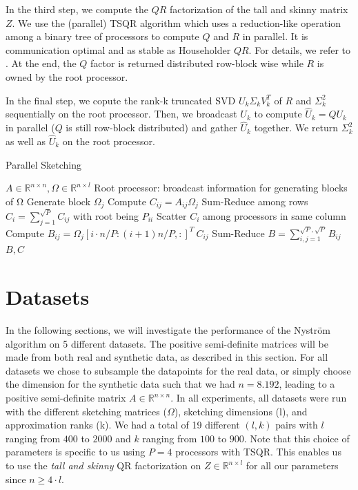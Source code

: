 \documentclass{article}
\theoremstyle{definition}
\begin{document}
In the third step, we compute the $QR$ factorization of the tall and skinny matrix $Z$. We use the (parallel) TSQR algorithm which uses a reduction-like operation among a binary tree of processors to compute $Q$ and $R$ in parallel. It is communication optimal and as stable as Householder $QR$. For details, we refer to \cite{demmel2008}. At the end, the $Q$ factor is returned distributed row-block wise while $R$ is owned by the root processor.

In the final step, we copute the rank-k truncated SVD $U_k \Sigma_k V_k^T$ of $R$ and $\Sigma_k^2$ sequentially on the root processor. Then, we broadcast $U_k$ to compute $\hat{U}_k = Q U_k$ in parallel ($Q$ is still row-block distributed) and gather $\hat{U}_k$ together. We return $\Sigma_k^2$ as well as $\hat{U}_k$ on the root processor.

\begin{algorithm}[t]
    \caption{Parallel Sketching} \label{algo:sketching}
    \begin{algorithmic}[1]
        \Require $A \in \mathbb{R}^{n \times n}, \Omega \in \mathbb{R}^{n \times l}$
        \State Root processor: broadcast information for generating blocks of Ω
            \State Generate block $\Omega_j$
            \State Compute $C_{ij} = A_{ij} \Omega_j$
            \State Sum-Reduce among rows $C_i = \sum_{j = 1}^{\sqrt{P}} C_{ij}$ with root being $P_{ii}$
            \State Scatter $C_i$ among processors in same column
            \State Compute $B_{ij} = \Omega_j[i \cdot n/P : (i+1) n/P, :]^T \ C_{ij}$
        \EndFor
        \State Sum-Reduce $B = \sum_{i,j = 1}^{\sqrt{P}, \sqrt{P}} B_{ij}$
        \Ensure $B, C$
    \end{algorithmic}
\end{algorithm}

\section{Datasets}\label{sec:datasets}

In the following sections, we will investigate the performance of the Nyström algorithm on 5 different datasets. The positive semi-definite matrices will be made from both real and synthetic data, as described in this section. For all datasets we chose to subsample the datapoints for the real data, or simply choose the dimension for the synthetic data such that we had $n=8.192$, leading to a positive semi-definite matrix $A\in\mathbb{R}^{n\times n}$. In all experiments, all datasets were run with the different sketching matrices ($\Omega$), sketching dimensions (l), and approximation ranks (k). We had a total of 19 different $(l,k)$ pairs with $l$ ranging from $400$ to $2000$ and $k$ ranging from $100$ to $900$. Note that this choice of parameters is specific to us using $P=4$ processors with TSQR. This enables us to use the \textit{tall and skinny} QR factorization on $Z\in\mathbb{R}^{n\times l}$ for all our parameters since $n\geq 4\cdot l$.\newline
\end{document}
